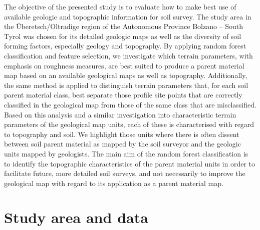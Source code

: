 \documentclass[preprint,12pt,authoryear]{elsarticle}
\begin{document}
The objective of the presented study is to evaluate how to make best use of available geologic and topographic information for soil survey. The study area in the \"{U}beretsch/Oltradige region of the Autonomous Province Bolzano -- South Tyrol was chosen for its detailed geologic maps as well as the diversity of soil forming factors, especially geology and topography. By applying random forest classification and feature selection, we investigate which terrain parameters, with emphasis on roughness measures, are best suited to produce a parent material map based on an available geological maps as well as topography. Additionally, the same method is applied to distinguish terrain parameters that, for each soil parent material class, best separate those profile site points that are correctly classified in the geological map from those of the same class that are misclassified. Based on this analysis and a similar investigation into characteristic terrain parameters of the geological map units, each of these is characterised with regard to topography and soil. We highlight those units where there is often dissent between soil parent material as mapped by the soil surveyor and the geologic units mapped by geologists. The main aim of the random forest classification is to identify the topographic characteristics of the parent material units in order to facilitate future, more detailed soil surveys, and not necessarily to improve the geological map with regard to its application as a parent material map.

\section{Study area and data}
\end{document}
